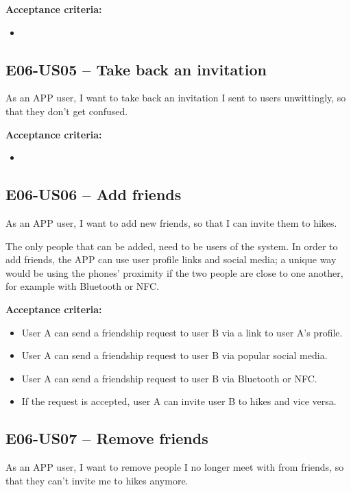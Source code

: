 \textbf{Acceptance criteria:}
\begin{itemize}
    \item 
\end{itemize}

\subsection*{E06-US05 -- Take back an invitation}
As an APP user, I want to take back an invitation I sent to users unwittingly, so that they don't get confused.

\textbf{Acceptance criteria:}
\begin{itemize}
    \item 
\end{itemize}


\subsection*{E06-US06 -- Add friends}
As an APP user, I want to add new friends, so that I can invite them to hikes.

The only people that can be added, need to be users of the system.
In order to add friends, the APP can use user profile links and social media; a unique way would be using the phones' proximity if the two people are close to one another, for example with Bluetooth or NFC.

\textbf{Acceptance criteria:}
\begin{itemize}
    \item User A can send a friendship request to user B via a link to user A's profile.
    \item User A can send a friendship request to user B via popular social media.
    \item User A can send a friendship request to user B via Bluetooth or NFC.
    \item If the request is accepted, user A can invite user B to hikes and vice versa.
\end{itemize}

\subsection*{E06-US07 -- Remove friends}
As an APP user, I want to remove people I no longer meet with from friends, so that they can't invite me to hikes anymore.

